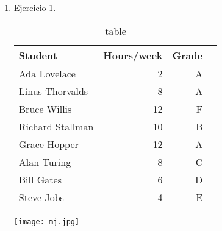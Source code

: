 \documentclass[10pt,a4paper,two]{book}
\begin{document}
 \begin{enumerate}
         \item Ejercicio 1.
         \begin{table}[ht]
                \begin{minipage}[b]{0.56\linewidth}
                \centering
                \begin{tabular}{ | l | r | r | r |}
                    \hline
                    Student & Hours/week & Grade \\ \hline \hline
                    Ada Lovelace & 2 & A \\ \hline
                    Linus Thorvalds & 8 & A \\ \hline
                    Bruce Willis & 12 & F \\ \hline
                    Richard Stallman & 10 & B \\ \hline
                    Grace Hopper & 12 & A \\ \hline
                    Alan Turing & 8 & C \\ \hline
                    Bill Gates & 6 & D \\ \hline
                    Steve Jobs & 4 & E \\ \hline
                   \end{tabular}
                    \caption{table}
                    \label{table:student}
                \end{minipage}\hfill
                \begin{minipage}[b]{0.4\linewidth}
                \centering
                \texttt{[image: mj.jpg]}
                \label{fig:image}
                \end{minipage}
                \end{table}
 \end{enumerate}
	
    	
\newpage


        \lipsum[2-4] %

       
 
 \newpage
 
         \lipsum[4-8] %



 \newpage
 
        \lipsum[5-9]    %
     

    
\end{document}
